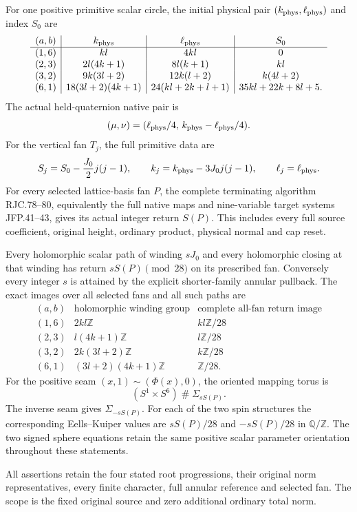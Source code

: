 \begin{theorem}
For one positive primitive scalar circle, the initial physical pair
\((k_{\rm phys},\ell_{\rm phys})\) and index \(S_0\) are
\[
\begin{array}{c|c|c|c}
(a,b)&k_{\rm phys}&\ell_{\rm phys}&S_0\\ \hline
(1,6)&kl&4kl&0\\
(2,3)&2l(4k+1)&8l(k+1)&kl\\
(3,2)&9k(3l+2)&12k(l+2)&k(4l+2)\\
(6,1)&18(3l+2)(4k+1)&24(kl+2k+l+1)&35kl+22k+8l+5.
\end{array}
\]
The actual held-quaternion native pair is
\[
(\mu,\nu)=(\ell_{\rm phys}/4,\,
k_{\rm phys}-\ell_{\rm phys}/4).
\]
For the vertical fan \(T_j\), the full primitive data are
\[
S_j=S_0-\frac{J_0}{2}j(j-1),\qquad
k_j=k_{\rm phys}-3J_0j(j-1),\qquad
\ell_j=\ell_{\rm phys}.
\]
For every selected lattice-basis fan \(P\), the complete terminating
algorithm RJC.78--80, equivalently the full native maps and
nine-variable target systems JFP.41--43, gives its actual integer
return \(S(P)\). This includes every full source coefficient, original
height, ordinary product, physical normal and cap reset.

Every holomorphic scalar path of winding \(sJ_0\) and every
holomorphic closing at that winding has return
\(sS(P)\pmod{28}\) on its prescribed fan. Conversely every
integer \(s\) is attained by the explicit shorter-family annular
pullback. The exact images over all selected fans and all such
paths are
\[
\begin{array}{c|c|c}
(a,b)&\text{holomorphic winding group}&
\text{complete all-fan return image}\\ \hline
(1,6)&2kl\mathbb Z&kl\mathbb Z/28\\
(2,3)&l(4k+1)\mathbb Z&l\mathbb Z/28\\
(3,2)&2k(3l+2)\mathbb Z&k\mathbb Z/28\\
(6,1)&(3l+2)(4k+1)\mathbb Z&\mathbb Z/28.
\end{array}
\]
For the positive seam \((x,1)\sim(\Phi(x),0)\), the oriented
mapping torus is
\[
(S^1\times S^6)\mathbin{\#}\Sigma_{sS(P)}.
\]
The inverse seam gives \(\Sigma_{-sS(P)}\). For each of the two
spin structures the corresponding Eells--Kuiper values are
\(sS(P)/28\) and \(-sS(P)/28\) in \(\mathbb Q/\mathbb Z\).
The two signed sphere equations retain the same positive scalar
parameter orientation throughout these statements.

All assertions retain the four stated root progressions, their
original norm representatives, every finite character, full annular
reference and selected fan. The scope is the fixed original source
and zero additional ordinary total norm.
\end{theorem}
